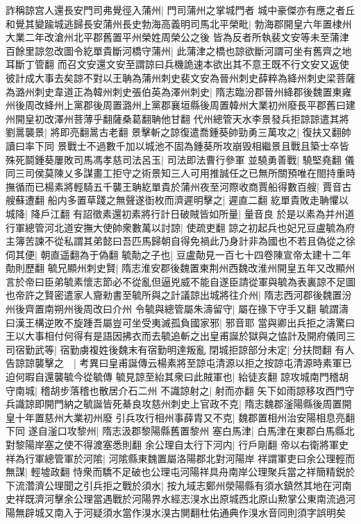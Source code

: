 詐稱諒宫人還長安門司弗覺徑入蒲州|{
	門司蒲州之掌城門者}
城中豪傑亦有應之者丘和覺其變踰城逃歸長安蒲州長史勃海高義明司馬北平榮毗|{
	勃海郡開皇六年置棣州大業二年改滄州北平郡舊置平州榮姓周榮公之後}
皆為反者所執裴文安等未至蒲津百餘里諒忽改圖令紇單貴斷河橋守蒲州|{
	此蒲津之橋也諒欲斷河謂可坐有舊齊之地耳斷丁管翻}
而召文安還文安至謂諒曰兵機詭速本欲出其不意王既不行文安又返使彼計成大事去矣諒不對以王聃為蒲州刺史裴文安為晉州刺史薛粹為絳州刺史梁菩薩為潞州刺史韋道正為韓州刺史張伯英為澤州刺史|{
	隋志臨汾郡晉州絳郡後魏置東雍州後周改絳州上黨郡後周置潞州上黨郡襄垣縣後周置韓州大業初州廢長平郡舊曰建州開皇初改澤州菩薄乎翻薩桑葛翻聃他甘翻}
代州總管天水李景發兵拒諒諒遣其將劉暠襲景|{
	將即亮翻暠古老翻}
景擊斬之諒復遣喬鍾葵帥勁勇三萬攻之|{
	復扶又翻帥讀曰率下同}
景戰士不過數千加以城池不固為鍾葵所攻崩毁相繼景且戰且築士卒皆殊死鬬鍾葵屢敗司馬馮孝慈司法呂玉|{
	司法即法曹行參軍}
並驍勇善戰|{
	驍堅堯翻}
儀同三司侯莫陳乂多謀畫工拒守之術景知三人可用推誠任之已無所關預唯在閤持重時撫循而已楊素將輕騎五千襲王聃紇單貴於蒲州夜至河際收商賈船得數百艘|{
	賈音古艘蘇遭翻}
船内多置草踐之無聲遂衘枚而濟遲明擊之|{
	遲直二翻}
紇單貴敗走聃懼以城降|{
	降戶江翻}
有詔徵素還初素將行計日破賊皆如所量|{
	量音良}
於是以素為并州道行軍總管河北道安撫大使帥衆數萬以討諒|{
	使疏吏翻}
諒之初起兵也妃兄豆盧毓為府主簿苦諫不從私謂其弟懿曰吾匹馬歸朝自得免禍此乃身計非為國也不若且偽從之徐伺其便|{
	朝直遥翻為于偽翻}
毓勣之子也|{
	豆盧勣見一百七十四卷陳宣帝太建十二年勣則歷翻}
毓兄顯州刺史賢|{
	隋志淮安郡後魏置東荆州西魏改淮州開皇五年又改顯州}
言於帝曰臣弟毓素懷志節必不從亂但逼兇威不能自遂臣請從軍與毓為表裏諒不足圖也帝許之賢密遣家人齎勑書至毓所與之計議諒出城將往介州|{
	隋志西河郡後魏置汾州後齊置南朔州後周改曰介州}
令毓與總管屬朱濤留守|{
	屬在掾下守手又翻}
毓謂濤曰漢王構逆敗不旋踵吾屬豈可坐受夷滅孤負國家邪|{
	邪音耶}
當與卿出兵拒之濤驚曰王以大事相付何得有是語因拂衣而去毓追斬之出皇甫誕於獄與之恊計及開府儀同三司宿勤武等|{
	宿勤虜複姓後魏末有宿勤明達叛亂}
閉城拒諒部分未定|{
	分扶問翻}
有人告諒諒襲擊之　|{
	考異曰皇甫誕傳云楊素將至諒屯清源以拒之按諒屯清源時素軍已迫何暇自還襲毓今從毓傳}
毓見諒至紿其衆曰此賊軍也|{
	紿徒亥翻}
諒攻城南門稽胡守南城|{
	稽胡步落稽也散居介石二州}
不識諒射之|{
	射而亦翻}
矢下如雨諒移攻西門守兵識諒即開門納之毓誕皆死綦良攻慈州刺史上官政不克|{
	隋志魏郡滏陽縣後周置開皇十年置慈州大業初州廢}
引兵攻行相州事薛胄又不克|{
	魏郡置相州治安陽相息亮翻下同}
遂自滏口攻黎州|{
	隋志汲郡黎陽縣舊置黎州}
塞白馬津|{
	白馬津在東郡白馬縣北對黎陽岸塞之使不得渡塞悉則翻}
余公理自太行下河内|{
	行戶剛翻}
帝以右衛將軍史祥為行軍總管軍於河隂|{
	河隂縣東魏置屬洛陽郡北對河陽岸}
祥謂軍吏曰余公理輕而無謀|{
	輕墟政翻}
恃衆而驕不足破也公理屯河陽祥具舟南岸公理聚兵當之祥簡精鋭於下流濳濟公理聞之引兵拒之戰於須水|{
	按九域志鄭州滎陽縣有須水鎮然其地在河南史祥既濟河擊余公理當遇戰於河陽界水經志湨水出原城西北原山勲掌公東南流過河陽無辟城又南入于河疑須水當作湨水湨古閴翻杜佑通典作湨水音同則須字誤明矣}
